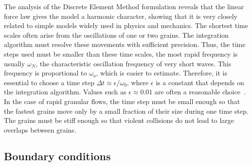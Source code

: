 The analysis of the Discrete Element Method formulation reveals that the linear 
force law gives the model a harmonic character, showing that it is very closely 
related to simple models widely used in physics and mechanics. The shortest 
time scales often arise from the oscillations of one or two grains. The 
integration algorithm must resolve these movements with sufficient precision. 
Thus, the time steps used must be smaller than these time scales, the most 
rapid frequency is usually ${\omega}_{\mathit{N}}$, the characteristic 
oscillation frequency of very short waves. This frequency is proportional to 
$\omega _{o}$, which is easier to estimate. Therefore, it is essential 
to choose a time step $\Delta t \approx \epsilon / \omega_{0}$, where 
$\epsilon$ is a constant that depends on the integration algorithm. Values such 
as $\epsilon \approx 0.01$ are often a reasonable choice~\citep{Radjai2011}. In 
the case of rapid granular flows, the time step must be small enough so that 
the fastest grains move only by a small fraction of their size during one 
time step. The grains must be stiff enough so that violent collisions do not 
lead to large overlaps between grains. 



\subsection{Boundary conditions}

